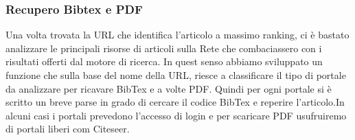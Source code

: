 \subsubsection{Recupero Bibtex e PDF}

Una volta trovata la URL che identifica l'articolo a massimo ranking, ci è bastato analizzare le principali risorse di articoli sulla Rete che combaciassero con i risultati offerti dal motore di ricerca. In quest senso abbiamo sviluppato un funzione che sulla base del nome della URL, riesce a classificare il tipo di portale da analizzare per ricavare BibTex e a volte PDF. Quindi per ogni portale si è scritto un breve parse in grado di cercare il codice BibTex e reperire l'articolo.In alcuni casi i portali prevedono l'accesso di login e per scaricare PDF usufruiremo di portali liberi com Citeseer.



